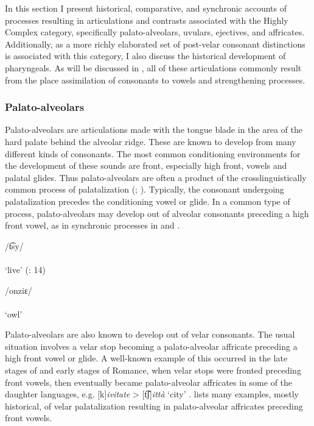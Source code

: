   In this section I present historical, comparative, and synchronic accounts of processes resulting in articulations and contrasts associated with the Highly Complex category, specifically palato-alveolars, uvulars, ejectives, and affricates. Additionally, as a more richly elaborated set of post-velar consonant distinctions is associated with this category, I also discuss the historical development of pharyngeals. As will be discussed in , all of these articulations commonly result from the place assimilation of consonants to vowels and strengthening processes.

\subsubsection{{Palato-alveolars}}\label{sec:4.5.2.1}

  Palato-alveolars are articulations made with the tongue blade in the area of the hard palate behind the alveolar ridge. These are known to develop from many different kinds of consonants. The most common conditioning environments for the development of these sounds are front, especially high front, vowels and palatal glides. Thus palato-alveolars are often a product of the crosslinguistically common process of palatalization (\citealt{Bhat1978}; \citealt{Bateman2007,BybeeEasterday2019}). Typically, the consonant undergoing palatalization precedes the conditioning vowel or glide. In a common type of process, palato-alveolars may develop out of alveolar consonants preceding a high front vowel, as in synchronic processes in   and  .

\ea\label{ex:4.36}
\gll /t͡sy/\\
[t͡ʃy]\\
\glt ‘live’ (\citealt{MatthewsYip1994}: 14)
\z

\ea\label{ex:4.37}
\gll /onziɛ/\\
[onʒiɛ]\\
\glt ‘owl’ \citep[18]{Dorvlo2008}
\z

  Palato-alveolars are also known to develop out of velar consonants. The usual situation involves a velar stop becoming a palato-alveolar affricate preceding a high front vowel or glide. A well-known example of this occurred in the late stages of  and early stages of Romance, when velar stops were fronted preceding front vowels, then eventually became palato-alveolar affricates in some of the daughter languages, e.g.  [k]\textit{ivitate} >  [t͡ʃ]\textit{ittà} ‘city’ \citep[113]{Posner1996}. \citet{Bhat1978} lists many examples, mostly historical, of velar palatalization resulting in palato-alveolar affricates preceding front vowels.

